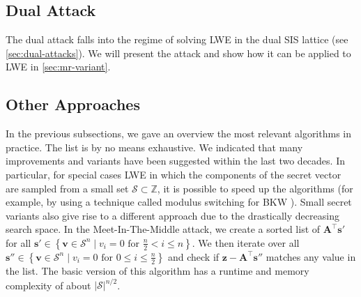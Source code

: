 








\subsection[Dual Attack]{Dual Attack \cite{MR09}} %
The dual attack \cite{MR09} falls into the regime of solving LWE in the dual SIS lattice (see \cref{sec:dual-attacks}). We will present the attack and show how it can be applied to LWE in \cref{sec:mr-variant}.



\subsection{Other Approaches}
In the previous subsections, we gave an overview the most relevant algorithms in practice. The list is by no means exhaustive. We indicated that many improvements and variants have been suggested within the last two decades. In particular, for special cases LWE in which the components of the secret vector are sampled from a small set $\mathcal{S} \subset \mathbb{Z}$, it is possible to speed up the algorithms (for example, by using a technique called modulus switching for BKW \cite{AFFP14}). %
Small secret variants also give rise to a different approach due to the drastically decreasing search space. In the Meet-In-The-Middle attack, we create a sorted list of $\mathbf{A}^\intercal \mathbf{s}'$ for all $\mathbf{s}' \in \left\{ \mathbf{v} \in \mathcal{S}^n \mid v_i = 0 \text{ for } \frac{n}{2} < i \leq n\right\}$. We then iterate over all $\mathbf{s}'' \in \left\{ \mathbf{v} \in \mathcal{S}^n \mid v_i = 0 \text{ for } 0 \leq i \leq \frac{n}{2}\right\}$ and check if $\mathbf{z} - \mathbf{A}^\intercal \mathbf{s}''$ matches any value in the list. The basic version of this algorithm has a runtime and memory complexity of about $|\mathcal{S}|^{n/2}$.

